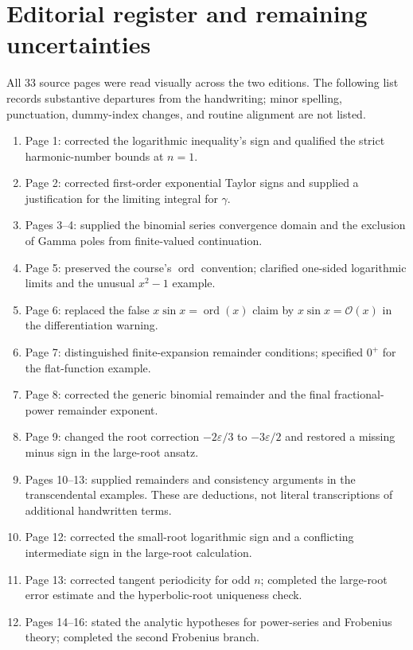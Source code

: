 \documentclass[11pt,a4paper]{article}
\newcommand{\eps}{\varepsilon}
\newcommand{\OO}{\mathcal O}
\DeclareMathOperator{\ord}{ord}
\numberwithin{equation}{section}
\begin{document}
\section{Editorial register and remaining uncertainties}
All 33 source pages were read visually across the two editions. The following list records
substantive departures from the handwriting; minor spelling,
punctuation, dummy-index changes, and routine alignment are not listed.
\begingroup\small
\setlength{\parskip}{2pt}
\begin{enumerate}
\setlength{\itemsep}{2pt}
 \item Page 1: corrected the logarithmic inequality's sign and
 qualified the strict harmonic-number bounds at $n=1$.
 \item Page 2: corrected first-order exponential Taylor signs and
 supplied a justification for the limiting integral for $\gamma$.
 \item Pages 3--4: supplied the binomial series convergence domain
 and the exclusion of Gamma poles from finite-valued continuation.
 \item Page 5: preserved the course's $\ord$ convention; clarified
 one-sided logarithmic limits and the unusual $x^2-1$ example.
 \item Page 6: replaced the false $x\sin x=\ord(x)$ claim by
 $x\sin x=\OO(x)$ in the differentiation warning.
 \item Page 7: distinguished finite-expansion remainder conditions;
 specified $0^+$ for the flat-function example.
 \item Page 8: corrected the generic binomial remainder and the
 final fractional-power remainder exponent.
 \item Page 9: changed the root correction $-2\eps/3$ to
 $-3\eps/2$ and restored a missing minus sign in the large-root ansatz.
 \item Pages 10--13: supplied remainders and consistency arguments
 in the transcendental examples. These are deductions, not literal
 transcriptions of additional handwritten terms.
 \item Page 12: corrected the small-root logarithmic sign and a
 conflicting intermediate sign in the large-root calculation.
 \item Page 13: corrected tangent periodicity for odd $n$; completed
 the large-root error estimate and the hyperbolic-root uniqueness check.
 \item Pages 14--16: stated the analytic hypotheses for power-series
 and Frobenius theory; completed the second Frobenius branch.

\end{enumerate}
\end{document}
